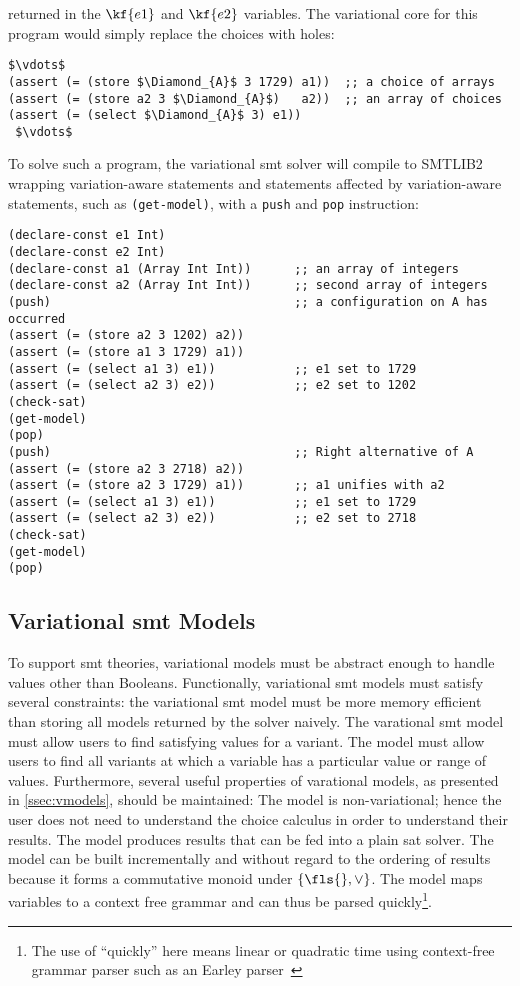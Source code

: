 returned in the $\kf{e1}$ and $\kf{e2}$ variables. The variational core for this
program would simply replace the choices with holes:
%
\begin{lstlisting}[columns=flexible,keepspaces=true]
 $\vdots$
(assert (= (store $\Diamond_{A}$ 3 1729) a1))  ;; a choice of arrays
(assert (= (store a2 3 $\Diamond_{A}$)   a2))  ;; an array of choices
(assert (= (select $\Diamond_{A}$ 3) e1))
 $\vdots$
\end{lstlisting}
%
To solve such a program, the variational \ac{smt} solver will compile to SMTLIB2
wrapping variation-aware statements and statements affected by variation-aware
statements, such as \texttt{(get-model)}, with a \texttt{push} and \texttt{pop}
instruction:
\begin{lstlisting}[columns=flexible,keepspaces=true]
(declare-const e1 Int)
(declare-const e2 Int)
(declare-const a1 (Array Int Int))      ;; an array of integers
(declare-const a2 (Array Int Int))      ;; second array of integers
(push)                                  ;; a configuration on A has occurred
(assert (= (store a2 3 1202) a2))
(assert (= (store a1 3 1729) a1))
(assert (= (select a1 3) e1))           ;; e1 set to 1729
(assert (= (select a2 3) e2))           ;; e2 set to 1202
(check-sat)
(get-model)
(pop)
(push)                                  ;; Right alternative of A
(assert (= (store a2 3 2718) a2))
(assert (= (store a2 3 1729) a1))       ;; a1 unifies with a2
(assert (= (select a1 3) e1))           ;; e1 set to 1729
(assert (= (select a2 3) e2))           ;; e2 set to 2718
(check-sat)
(get-model)
(pop)
\end{lstlisting}

\subsection{Variational \ac{smt} Models}
To support \ac{smt} theories, variational models must be abstract enough to
handle values other than Booleans. Functionally, variational \ac{smt} models
must satisfy several constraints: the variational \ac{smt} model must be more
memory efficient than storing all models returned by the solver naively. The
varational \ac{smt} model must allow users to find satisfying values for a
variant. The model must allow users to find all variants at which a variable has
a particular value or range of values. Furthermore, several useful properties of
varational models, as presented in \autoref{ssec:vmodels}, should be maintained:
The model is non-variational; hence the user does not need to understand the
choice calculus in order to understand their results. The model produces results
that can be fed into a plain \ac{sat} solver. The model can be built
incrementally and without regard to the ordering of results because it forms a
commutative monoid under $\{\fls{}, \vee\}$. The model maps variables to a context free
grammar and can thus be parsed quickly\footnote{The use of ``quickly'' here
  means linear or quadratic time using context-free grammar parser such as an
  Earley parser~\cite{10.1145/362007.362035}}.


